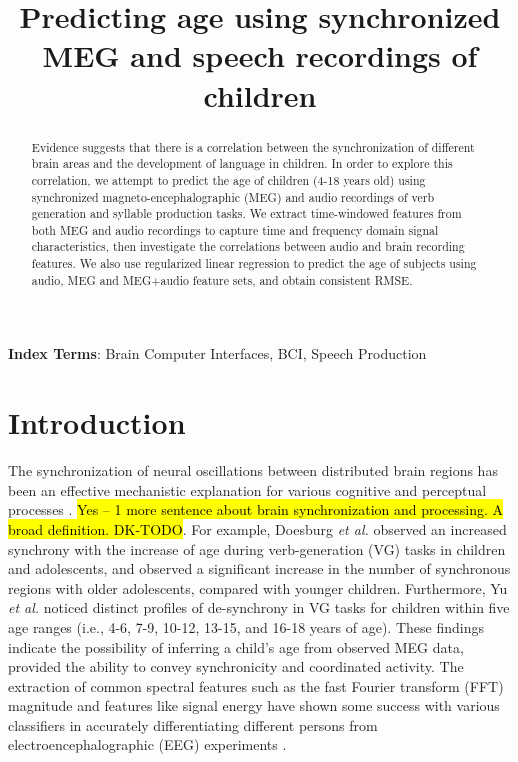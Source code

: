 \documentclass[a4paper]{article}
\title{Predicting age using synchronized MEG and speech recordings of children}
\newcommand{\FR}[1]{{\small \textcolor{red}{\hl{#1}}}}
\begin{document}
\maketitle
% 
\begin{abstract}
Evidence suggests that there is a correlation between the synchronization of different brain areas and the development of language in children. In order to explore this correlation, we attempt to predict the age of children (4-18 years old) using synchronized magneto-encephalographic (MEG) and audio recordings of verb generation and syllable production tasks. We extract time-windowed features from both MEG and audio recordings to capture time and frequency domain signal characteristics, then investigate the correlations between audio and brain recording features. We also use regularized linear regression to predict the age of subjects using audio, MEG and MEG+audio feature sets, and obtain consistent RMSE.
\end{abstract}


\noindent\textbf{Index Terms}: Brain Computer Interfaces, BCI, Speech Production

\section{Introduction}

The synchronization of neural oscillations between distributed brain regions has been an effective mechanistic explanation for various cognitive and perceptual processes \cite{Fries2015,Nakasaki1989,NeuralSync}. \FR{Yes -- 1 more sentence about brain synchronization and processing. A broad definition. DK-TODO}. For example, Doesburg {\em et al.} \cite{Doesburg2016} observed an increased synchrony with the increase of age during verb-generation (VG) tasks in children and adolescents, and observed a significant increase in the number of synchronous regions with older adolescents, compared with younger children. Furthermore, Yu {\em et al.} \cite{Yu2014} noticed distinct profiles of de-synchrony in VG tasks for children within five age ranges (i.e., 4-6, 7-9, 10-12, 13-15, and 16-18 years of age). These findings indicate the possibility of inferring a child's age from observed MEG data, provided the ability to convey synchronicity and coordinated activity. The extraction of common spectral features such as the fast Fourier transform (FFT) magnitude and features like signal energy have shown some success with various classifiers in accurately differentiating different persons from electroencephalographic (EEG) experiments \cite{Nguyen2012, Poulos2001}.
\end{document}
